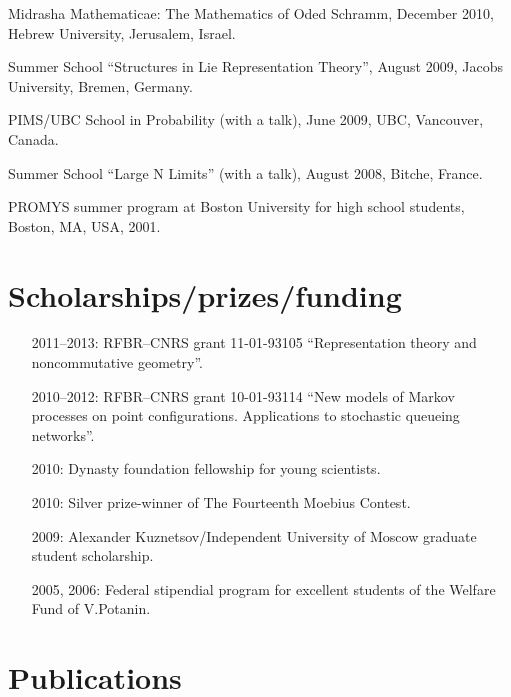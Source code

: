 \documentclass[letterpaper,11pt]{article}
\begin{document}
\begin{etaremune}
\item Midrasha Mathematicae: The Mathematics of Oded Schramm, December 2010, Hebrew University, Jerusalem, Israel. 

\item Summer School ``Structures in Lie Representation Theory'', August 2009, Jacobs University, Bremen, Germany. 

\item PIMS/UBC School in Probability (with a talk), June 2009, UBC, Vancouver, Canada. 

\item 
Summer School ``Large N Limits'' (with a talk), August 2008, Bitche, France. 

\item PROMYS summer program at Boston University for high school students, Boston, MA, USA, 2001.
\end{etaremune}

\section*{Scholarships/prizes/funding}
\begin{itemize}
  \item[2011--2013:] RFBR--CNRS grant 11-01-93105 ``Representation theory and noncommutative geometry''.
  
  \item[2010--2012:] RFBR--CNRS grant 10-01-93114 ``New models of Markov processes on point configurations. Applications to stochastic queueing networks''.

  \item[2010:] Dynasty foundation fellowship for young scientists.
    
  \item[2010:] Silver prize-winner of The Fourteenth Moebius Contest.

  \item[2009:] Alexander Kuznetsov/Independent University of Moscow graduate student scholarship.

  \item[2005, 2006:] Federal stipendial program for excellent students of the Welfare Fund of V.Potanin.
\end{itemize}

\section*{Publications}
\end{document}
